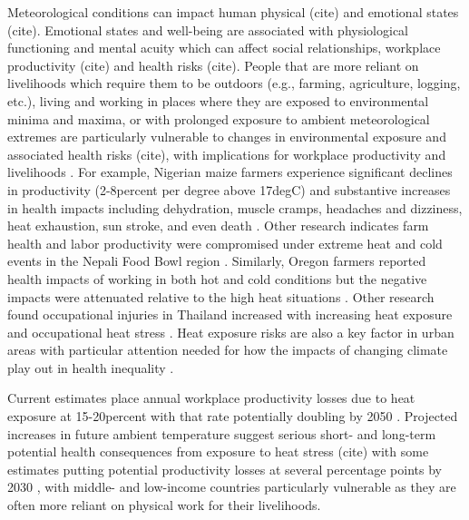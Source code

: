\documentclass{article}
\begin{document}
Meteorological conditions can impact human physical (cite) and emotional states (cite). Emotional states and well-being are associated with physiological functioning and mental acuity which can affect social relationships, workplace productivity (cite) and health risks (cite). People that are more reliant on livelihoods which require them to be outdoors (e.g., farming, agriculture, logging, etc.), living and working in places where they are exposed to environmental minima and maxima, or with prolonged exposure to ambient meteorological extremes are particularly vulnerable to changes in environmental exposure \citep{frimpong_heat_2017} and associated health risks (cite), with implications for workplace productivity and livelihoods \cite{kjellstrom_impact_2016}. For example, Nigerian maize farmers experience significant declines in productivity (2-8percent per degree above 17degC) and substantive increases in health impacts including dehydration, muscle cramps, headaches and dizziness, heat exhaustion, sun stroke, and even death \cite{sadiq_impact_2019}. Other research indicates farm health and labor productivity were compromised under extreme heat and cold events in the Nepali Food Bowl region \cite{budhathoki_socio-economic_2019}. Similarly, Oregon farmers reported health impacts of working in both hot and cold conditions but the negative impacts were attenuated relative to the high heat situations \cite{bethel_heat-related_2014}. Other research found occupational injuries in Thailand increased with increasing heat exposure and occupational heat stress \cite{tawatsupa_association_2013}. Heat exposure risks are also a key factor in urban areas with particular attention needed for how the impacts of changing climate play out in health inequality \cite{friel_urban_2011}. 

Current estimates place annual workplace productivity losses due to heat exposure at 15-20percent with that rate potentially doubling by 2050 \cite{kjellstrom_heat_2016}. Projected increases in future ambient temperature suggest serious short- and long-term potential health consequences from exposure to heat stress (cite) with some estimates putting potential productivity losses at several percentage points by 2030 \cite{kjellstrom_heat_2016}, with middle- and low-income countries particularly vulnerable as they are often more reliant on physical work for their livelihoods. 
\end{document}
